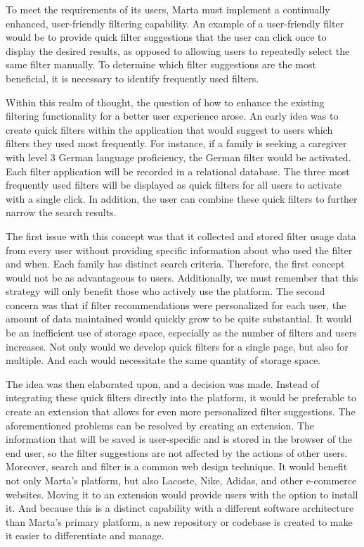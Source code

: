 To meet the requirements of its users, Marta must implement a continually enhanced, user-friendly filtering capability. An example of a user-friendly filter would be to provide quick filter suggestions that the user can click once to display the desired results, as opposed to allowing users to repeatedly select the same filter manually. To determine which filter suggestions are the most beneficial, it is necessary to identify frequently used filters.

Within this realm of thought, the question of how to enhance the existing filtering functionality for a better user experience arose. An early idea was to create quick filters within the application that would suggest to users which filters they used most frequently. For instance, if a family is seeking a caregiver with level 3 German language proficiency, the German filter would be activated. Each filter application will be recorded in a relational database. The three most frequently used filters will be displayed as quick filters for all users to activate with a single click. In addition, the user can combine these quick filters to further narrow the search results.

The first issue with this concept was that it collected and stored filter usage data from every user without providing specific information about who used the filter and when. Each family has distinct search criteria. Therefore, the first concept would not be as advantageous to users. Additionally, we must remember that this strategy will only benefit those who actively use the platform. The second concern was that if filter recommendations were personalized for each user, the amount of data maintained would quickly grow to be quite substantial. It would be an inefficient use of storage space, especially as the number of filters and users increases. Not only would we develop quick filters for a single page, but also for multiple. And each would necessitate the same quantity of storage space.

The idea was then elaborated upon, and a decision was made. Instead of integrating these quick filters directly into the platform, it would be preferable to create an extension that allows for even more personalized filter suggestions. The aforementioned problems can be resolved by creating an extension. The information that will be saved is user-specific and is stored in the browser of the end user, so the filter suggestions are not affected by the actions of other users. Moreover, search and filter is a common web design technique. It would benefit not only Marta's platform, but also Lacoste, Nike, Adidas, and other e-commerce websites. Moving it to an extension would provide users with the option to install it. And because this is a distinct capability with a different software architecture than Marta's primary platform, a new repository or codebase is created to make it easier to differentiate and manage.

